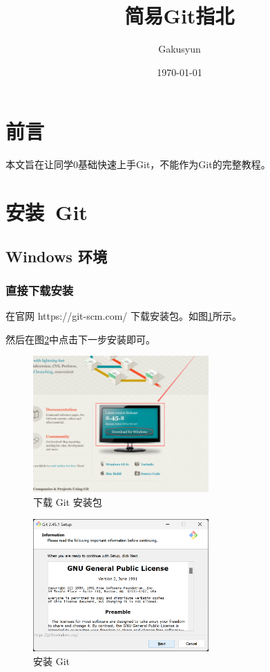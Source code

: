 \documentclass[UTF8]{ctexart}
\title{简易Git指北}
\author{Gakusyun}
\date{\today}
\begin{document}
\maketitle
\thispagestyle{empty}
\newpage
\tableofcontents
\thispagestyle{empty}
\newpage
\section{前言}
本文旨在让同学0基础快速上手Git，不能作为Git的完整教程。
\newpage
\section{安装\ Git}
\subsection{Windows 环境}
\subsubsection{直接下载安装}
在官网 https://git-scm.com/ 下载安装包。如图\ref{install:downloadGit-Windows}所示。

然后在图\ref{install:gitinstaller}中点击下一步安装即可。
\begin{figure}[h]
    \centering
    \includegraphics[width=0.6\textwidth]{./img/downloadGit-Windows}
    \caption{下载 Git 安装包}
    \label{install:downloadGit-Windows}
\end{figure}
\begin{figure}[h]
    \centering
    \includegraphics[width=0.6\textwidth]{./img/gitinstaller}
    \caption{安装 Git}
    \label{install:gitinstaller}
\end{figure}
\end{document}
